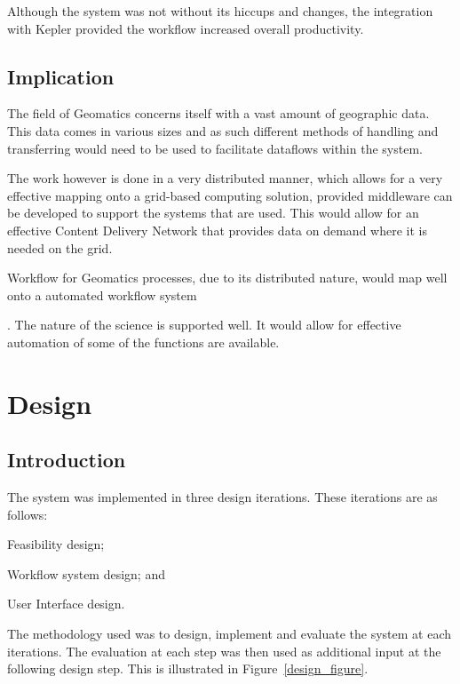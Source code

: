 \documentclass[12pt,a4paper]{report}
\begin{document}
      Although the system was not without its hiccups and changes, the
      integration with Kepler provided the workflow increased overall
      productivity.


\section{Implication}
The field of Geomatics concerns itself with a vast amount of geographic data.
This data comes in various sizes and as such different methods of handling and
transferring would need to be used to facilitate dataflows within the system.

The work however is done in a very distributed manner, which allows for a very
effective mapping onto a grid-based computing solution, provided middleware can
be developed to support the systems that are
used\cite{Montella:2007:UGC:1272980.1272995}. This would allow for an
effective Content Delivery Network that provides data on demand where it is
needed on the grid.

Workflow for Geomatics processes, due to its distributed nature, would map well
onto a automated workflow system

\cite{Withana:2010:VWE:1851476.1851586}. The nature of the science is supported
well. It would allow for effective automation of some of the functions are
available.

\chapter{Design\label{chap2}}
\section{Introduction}
The  system was implemented in three design iterations. These iterations are
as follows: \begin{inparaenum}[(i)] \item Feasibility design;
\item Workflow system design; and \item User Interface design.
\end{inparaenum} The methodology used was to design, implement
and evaluate the system at each iterations. The evaluation at
each step was then used as additional input at the following
design step. This is illustrated in Figure~\ref{design_figure}.
\end{document}
